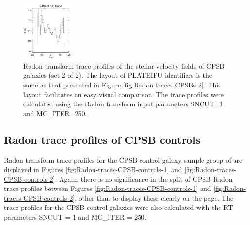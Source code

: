 \documentclass[fleqn,usenatbib]{mnras}
\begin{document}
\begin{figure}
    \includegraphics[width=0.23\textwidth]{Images/SN1-MC250/CPSBs/9494-3703-1-250.png}
    \caption{Radon transform trace profiles of the stellar velocity fields of CPSB galaxies (set 2 of 2). The layout of PLATEIFU identifiers is the same as that presented in Figure \ref{fig:Radon-traces-CPSBs-2}. This layout facilitates an easy visual comparison. The trace profiles were calculated using the Radon transform input parameters SNCUT=1 and MC\_ITER=250.}
    \label{fig:Radon-traces-CPSBs-2-SN1-MC250}
\end{figure}


\subsection{Radon trace profiles of CPSB controls}
\label{sec:CPSB_controls}

Radon transform trace profiles for the CPSB control galaxy sample group of are displayed in Figures \ref{fig:Radon-traces-CPSB-controls-1} and \ref{fig:Radon-traces-CPSB-controls-2}. Again, there is no significance in the split of CPSB Radon trace profiles between Figures \ref{fig:Radon-traces-CPSB-controls-1} and \ref{fig:Radon-traces-CPSB-controls-2}, other than to display these clearly on the page. The trace profiles for the CPSB control galaxies were also calculated with the RT parameters SNCUT = 1 and MC\_ITER = 250.
\end{document}
